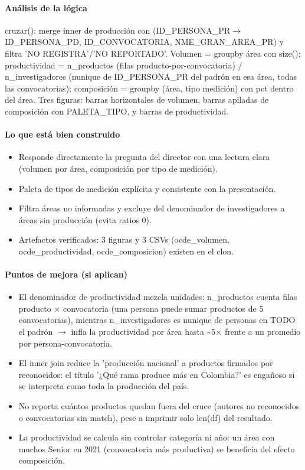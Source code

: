 \paragraph{Análisis de la lógica}
cruzar(): merge inner de producción con (ID\_PERSONA\_PR$\rightarrow$ID\_PERSONA\_PD, ID\_CONVOCATORIA, NME\_GRAN\_AREA\_PR) y filtra 'NO REGISTRA'/'NO REPORTADO'. Volumen = groupby área con size(); productividad = n\_productos (filas producto-por-convocatoria) / n\_investigadores (nunique de ID\_PERSONA\_PR del padrón en esa área, todas las convocatorias); composición = groupby (área, tipo medición) con pct dentro del área. Tres figuras: barras horizontales de volumen, barras apiladas de composición con PALETA\_TIPO, y barras de productividad.

\paragraph{Lo que está bien construido}
\begin{itemize}
  \item Responde directamente la pregunta del director con una lectura clara (volumen por área, composición por tipo de medición).
  \item Paleta de tipos de medición explícita y consistente con la presentación.
  \item Filtra áreas no informadas y excluye del denominador de investigadores a áreas sin producción (evita ratios 0).
  \item Artefactos verificados: 3 figuras y 3 CSVs (ocde\_volumen, ocde\_productividad, ocde\_composicion) existen en el clon.
\end{itemize}

\paragraph{Puntos de mejora (si aplican)}
\begin{itemize}
  \item El denominador de productividad mezcla unidades: n\_productos cuenta filas producto $\times$ convocatoria (una persona puede sumar productos de 5 convocatorias), mientras n\_investigadores es nunique de personas en TODO el padrón $\rightarrow$ infla la productividad por área hasta \textasciitilde{}5$\times$ frente a un promedio por persona-convocatoria.
  \item El inner join reduce la 'producción nacional' a productos firmados por reconocidos: el título '¿Qué rama produce más en Colombia?' es engañoso si se interpreta como toda la producción del país.
  \item No reporta cuántos productos quedan fuera del cruce (autores no reconocidos o convocatorias sin match), pese a imprimir solo len(df) del resultado.
  \item La productividad se calcula sin controlar categoría ni año: un área con muchos Senior en 2021 (convocatoria más productiva) se beneficia del efecto composición.
\end{itemize}

